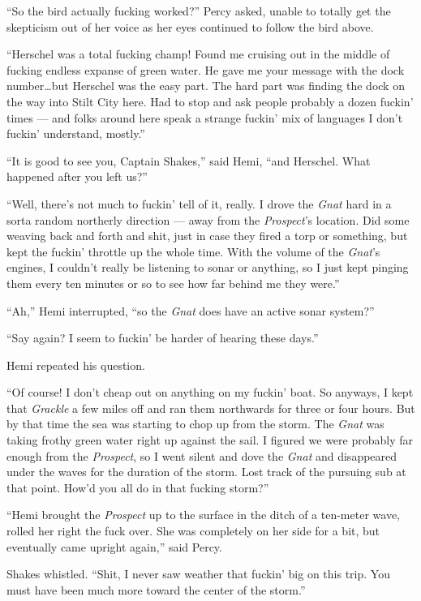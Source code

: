 \documentclass[
]{scrbook}
\begin{document}
``So the bird actually fucking worked?'' Percy asked, unable to totally
get the skepticism out of her voice as her eyes continued to follow the
bird above.

``Herschel was a total fucking champ! Found me cruising out in the
middle of fucking endless expanse of green water. He gave me your
message with the dock number\ldots but Herschel was the easy part. The
hard part was finding the dock on the way into Stilt City here. Had to
stop and ask people probably a dozen fuckin' times --- and folks around
here speak a strange fuckin' mix of languages I don't fuckin'
understand, mostly.''

``It is good to see you, Captain Shakes,'' said Hemi, ``and Herschel.
What happened after you left us?''

``Well, there's not much to fuckin' tell of it, really. I drove the
\emph{Gnat} hard in a sorta random northerly direction --- away from the
\emph{Prospect}'s location. Did some weaving back and forth and shit,
just in case they fired a torp or something, but kept the fuckin'
throttle up the whole time. With the volume of the \emph{Gnat}'s
engines, I couldn't really be listening to sonar or anything, so I just
kept pinging them every ten minutes or so to see how far behind me they
were.''

``Ah,'' Hemi interrupted, ``so the \emph{Gnat} does have an active sonar
system?''

``Say again? I seem to fuckin' be harder of hearing these days.''

Hemi repeated his question.

``Of course! I don't cheap out on anything on my fuckin' boat. So
anyways, I kept that \emph{Grackle} a few miles off and ran them
northwards for three or four hours. But by that time the sea was
starting to chop up from the storm. The \emph{Gnat} was taking frothy
green water right up against the sail. I figured we were probably far
enough from the \emph{Prospect}, so I went silent and dove the
\emph{Gnat} and disappeared under the waves for the duration of the
storm. Lost track of the pursuing sub at that point. How'd you all do in
that fucking storm?''

``Hemi brought the \emph{Prospect} up to the surface in the ditch of a
ten-meter wave, rolled her right the fuck over. She was completely on
her side for a bit, but eventually came upright again,'' said Percy.

Shakes whistled. ``Shit, I never saw weather that fuckin' big on this
trip. You must have been much more toward the center of the storm.''
\end{document}
